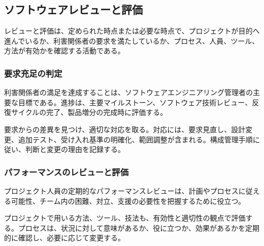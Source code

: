 \subsection{ソフトウェアレビューと評価}
レビューと評価は、定められた時点または必要な時点で、プロジェクトが目的へ進んでいるか、利害関係者の要求を満たしているか、プロセス、人員、ツール、方法が有効かを確認する活動である。

\subsubsection{要求充足の判定}
利害関係者の満足を達成することは、ソフトウェアエンジニアリング管理者の主要な目標である。進捗は、主要マイルストーン、ソフトウェア技術レビュー、反復サイクルの完了、製品増分の完成時に評価する。

要求からの差異を見つけ、適切な対応を取る。対応には、要求見直し、設計変更、追加テスト、受け入れ基準の明確化、範囲調整が含まれる。構成管理手順に従い、判断と変更の理由を記録する。

\subsubsection{パフォーマンスのレビューと評価}
プロジェクト人員の定期的なパフォーマンスレビューは、計画やプロセスに従える可能性、チーム内の困難、対立、支援の必要性を把握するために役立つ。

プロジェクトで用いる方法、ツール、技法も、有効性と適切性の観点で評価する。プロセスは、状況に対して意味があるか、役に立つか、効果があるかを定期的に確認し、必要に応じて変更する。
